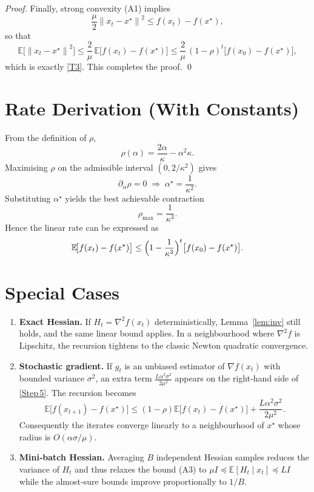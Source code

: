 \documentclass{article}
\newcommand{\E}{\mathbb{E}}
\newcommand{\norm}[1]{\left\lVert #1\right\rVert}
\begin{document}
\begin{proof}
Finally, strong convexity (A1) implies
\[
   \frac{\mu}{2}\norm{x_t-x^{\star}}^{2}
   \le f(x_t)-f(x^{\star}),
\]
so that
\[
   \E\!\bigl[\norm{x_t-x^{\star}}^{2}\bigr]
   \le\frac{2}{\mu}\,\E\!\bigl[f(x_t)-f(x^{\star})\bigr]
   \le\frac{2}{\mu}\,(1-\rho)^{t}\bigl[f(x_{0})-f(x^{\star})\bigr],
\]
which is exactly \eqref{T3}.  This completes the proof. \qed
\end{proof}

\section*{Rate Derivation (With Constants)}
From the definition of $\rho$,
\[
   \rho(\alpha)=\frac{2\alpha}{\kappa}-\alpha^{2}\kappa .
\]
Maximising $\rho$ on the admissible interval $(0,2/\kappa^{2})$ gives
\[
   \partial_{\alpha}\rho=0\;\Longrightarrow\;
   \alpha^{\star}=\frac{1}{\kappa^{2}} .
\]
Substituting $\alpha^{\star}$ yields the best achievable contraction
\[
   \rho_{\max}= \frac{1}{\kappa^{3}} .
\]
Hence the linear rate can be expressed as
\[
   \E\!\bigl[f(x_{t})-f(x^{\star})\bigr]
   \le\Bigl(1-\frac{1}{\kappa^{3}}\Bigr)^{t}\bigl[f(x_{0})-f(x^{\star})\bigr].
\]

\section*{Special Cases}
\begin{enumerate}[label=\alph*)]
\item \textbf{Exact Hessian.} If $H_t=\nabla^{2}f(x_t)$ deterministically,
    Lemma~\ref{lem:inv} still holds, and the same linear bound applies.
    In a neighbourhood where $\nabla^{2}f$ is Lipschitz, the recursion tightens
    to the classic Newton quadratic convergence.
\item \textbf{Stochastic gradient.} If $g_t$ is an unbiased estimator of
    $\nabla f(x_t)$ with bounded variance $\sigma^{2}$,
    an extra term $\frac{L\alpha^{2}\sigma^{2}}{2\mu^{2}}$ appears on the right‑hand
    side of \eqref{Step 5}.  The recursion becomes
    \[
       \E\!\bigl[f(x_{t+1})-f(x^{\star})\bigr]
       \le (1-\rho)\E\!\bigl[f(x_t)-f(x^{\star})\bigr]
          +\frac{L\alpha^{2}\sigma^{2}}{2\mu^{2}} .
    \]
    Consequently the iterates converge linearly to a neighbourhood of $x^{\star}$
    whose radius is $O(\alpha\sigma/\mu)$.
\item \textbf{Mini‑batch Hessian.} Averaging $B$ independent Hessian samples
    reduces the variance of $H_t$ and thus relaxes the bound (A3) to
    $\mu I\preceq\E[H_t\mid x_t]\preceq L I$ while the almost‑sure bounds improve
    proportionally to $1/B$.
\end{enumerate}
\end{document}

